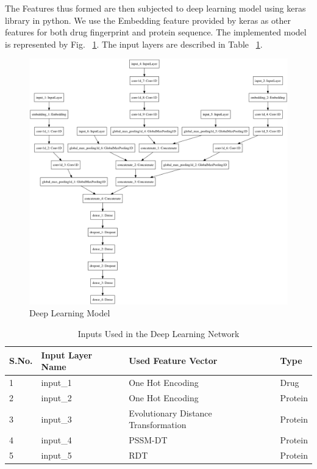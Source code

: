 The Features thus formed are then subjected to deep learning model using keras library in python. We use the Embedding feature provided by keras as other features for both drug fingerprint and protein sequence. The implemented model is represented by Fig. ~\ref{fig:dlm}. The input layers are described in Table ~\ref{table:inputs}.

\begin{figure}[ht]
\centering
\includegraphics[width=1\linewidth]{mainmatter/3-Methodology/images/build_combined_categorical_tensor_contact_new.png}
\caption{Deep Learning Model}
\label{fig:dlm}
\end{figure}
\begin{table}[ht]\centering
  \begin{tabular}{|l|l|l|l|}
    
    \hline \label{table:inputs}
    S.No. & Input Layer Name & Used Feature Vector & Type \\ \hline
    1 & input\_1 & One Hot Encoding & Drug \\ \hline
    2 & input\_2 & One Hot Encoding & Protein \\ \hline
    3 & input\_3 & Evolutionary Distance Transformation& Protein \\ \hline
    4 & input\_4 & PSSM-DT & Protein \\ \hline
    5 & input\_5 & RDT & Protein \\   \hline 
  \end{tabular} 
  \caption{Inputs Used in the Deep Learning Network} 
\end{table}

